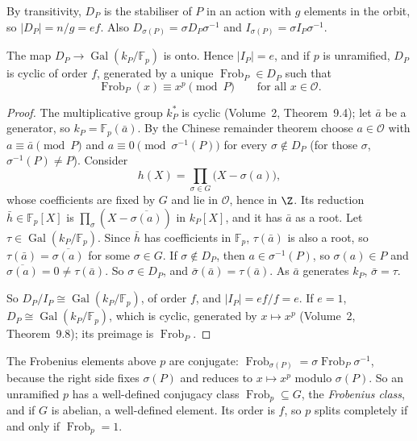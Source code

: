 By transitivity, $D_P$ is the stabiliser of $P$ in an action with $g$ elements in the orbit, so $|D_P|=n/g=ef$. Also
$D_{\sigma(P)}=\sigma D_P\sigma^{-1}$ and $I_{\sigma(P)}=\sigma I_P\sigma^{-1}$.

\begin{theorem}\label{thm:decomp}
The map $D_P\to\operatorname{Gal}(k_P/\mathbb F_p)$ is onto. Hence $|I_P|=e$, and if $p$ is unramified, $D_P$ is cyclic of
order $f$, generated by a unique $\operatorname{Frob}_P\in D_P$ such that
\[
\operatorname{Frob}_P(x)\equiv x^p\pmod P\qquad\text{for all }x\in\mathcal O.
\]
\end{theorem}
\begin{proof}
The multiplicative group $k_P^*$ is cyclic (Volume~2, Theorem~9.4); let $\bar a$ be a generator, so $k_P=\mathbb F_p(\bar
a)$. By the Chinese remainder theorem choose $a\in\mathcal O$ with $a\equiv\bar a\pmod P$ and $a\equiv0\pmod
{\sigma^{-1}(P)}$ for every $\sigma\notin D_P$ (for those $\sigma$, $\sigma^{-1}(P)\ne P$). Consider
\[
h(X)=\prod_{\sigma\in G}\bigl(X-\sigma(a)\bigr),
\]
whose coefficients are fixed by $G$ and lie in $\mathcal O$, hence in $\Z$. Its reduction $\bar h\in\mathbb F_p[X]$ is
$\prod_\sigma(X-\overline{\sigma(a)})$ in $k_P[X]$, and it has $\bar a$ as a root. Let $\tau\in
\operatorname{Gal}(k_P/\mathbb F_p)$. Since $\bar h$ has coefficients in $\mathbb F_p$, $\tau(\bar a)$ is also a root, so
$\tau(\bar a)=\overline{\sigma(a)}$ for some $\sigma\in G$. If $\sigma\notin D_P$, then $a\in\sigma^{-1}(P)$, so
$\sigma(a)\in P$ and $\overline{\sigma(a)}=0\ne\tau(\bar a)$. So $\sigma\in D_P$, and $\bar\sigma(\bar a)=\tau(\bar a)$.
As $\bar a$ generates $k_P$, $\bar\sigma=\tau$.

So $D_P/I_P\cong\operatorname{Gal}(k_P/\mathbb F_p)$, of order $f$, and $|I_P|=ef/f=e$. If $e=1$, $D_P\cong
\operatorname{Gal}(k_P/\mathbb F_p)$, which is cyclic, generated by $x\mapsto x^p$ (Volume~2, Theorem~9.8); its preimage is
$\operatorname{Frob}_P$.
\end{proof}

The Frobenius elements above $p$ are conjugate: $\operatorname{Frob}_{\sigma(P)}=\sigma\operatorname{Frob}_P\sigma^{-1}$,
because the right side fixes $\sigma(P)$ and reduces to $x\mapsto x^p$ modulo $\sigma(P)$. So an unramified $p$ has a
well-defined conjugacy class $\operatorname{Frob}_p\subseteq G$, the \emph{Frobenius class}, and if $G$ is abelian, a
well-defined element. Its order is $f$, so $p$ splits completely if and only if $\operatorname{Frob}_p=1$.

